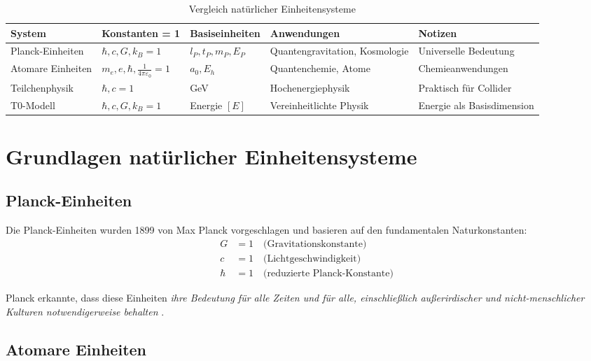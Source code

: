 \documentclass[11pt,a4paper]{article}
\begin{document}
	\begin{table}[htbp]
		\centering
		\begin{adjustbox}{width=0.95\textwidth}
			\begin{tabular}{lllll}
				\toprule
				\textbf{System} & \textbf{Konstanten = 1} & \textbf{Basiseinheiten} & \textbf{Anwendungen} & \textbf{Notizen} \\
				\midrule
				Planck-Einheiten & $\hbar, c, G, k_B = 1$ & $l_P, t_P, m_P, E_P$ & Quantengravitation, Kosmologie & Universelle Bedeutung \\
				Atomare Einheiten & $m_e, e, \hbar, \frac{1}{4\pi\varepsilon_0} = 1$ & $a_0, E_h$ & Quantenchemie, Atome & Chemieanwendungen \\
				Teilchenphysik & $\hbar, c = 1$ & GeV & Hochenergiephysik & Praktisch für Collider \\
				T0-Modell & $\hbar, c, G, k_B = 1$ & Energie $[E]$ & Vereinheitlichte Physik & Energie als Basisdimension \\
				\bottomrule
			\end{tabular}
		\end{adjustbox}
		\caption{Vergleich natürlicher Einheitensysteme}
		\label{tab:einheitensysteme}
	\end{table}
	
	\section{Grundlagen natürlicher Einheitensysteme}
	
	\subsection{Planck-Einheiten}
	
	Die Planck-Einheiten wurden 1899 von Max Planck vorgeschlagen \cite{planck1900,planck1906} und basieren auf den fundamentalen Naturkonstanten:
	\begin{align}
		G &= 1 \quad \text{(Gravitationskonstante)} \\
		c &= 1 \quad \text{(Lichtgeschwindigkeit)} \\
		\hbar &= 1 \quad \text{(reduzierte Planck-Konstante)}
	\end{align}
	
	Planck erkannte, dass diese Einheiten \textit{ihre Bedeutung für alle Zeiten und für alle, einschließlich außerirdischer und nicht-menschlicher Kulturen notwendigerweise behalten} \cite{planck1900}.
	
	\subsection{Atomare Einheiten}
	
\end{document}
